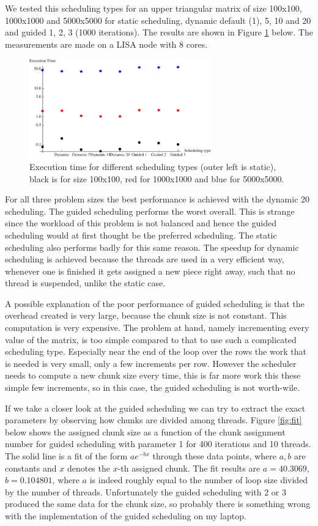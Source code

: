 \documentclass[11pt,a4paper,onecolumn]{article}
\begin{document}
We tested this scheduling types for an upper triangular matrix of size 100x100, 1000x1000 and 5000x5000 for static scheduling, dynamic default (1), 5, 10 and 20 and guided 1, 2, 3 (1000 iterations). The results are shown in Figure \ref{fig:chunks} below. The measurements are made on a LISA node with 8 cores.

\begin{figure}[H]
  \centering
  \includegraphics[width=0.7\textwidth]{chunks.pdf}
  \caption{Execution time for different scheduling types (outer left is static), black is for size 100x100, red for 1000x1000 and blue for 5000x5000.}
  \label{fig:chunks}
\end{figure}

For all three problem sizes the best performance is achieved with the dynamic 20 scheduling. The guided scheduling performs the worst overall. This is strange since the workload of this problem is not balanced and hence the guided scheduling would at first thought be the preferred scheduling. The static scheduling also performs badly for this same reason. The speedup for dynamic scheduling is achieved because the threads are used in a very efficient way, whenever one is finished it gets assigned a new piece right away, such that no thread is suspended, unlike the static case. 

A possible explanation of the poor performance of guided scheduling is that the overhead created is very large, because the chunk size is not constant. This computation is very expensive. The problem at hand, namely incrementing every value of the matrix, is too simple compared to that to use such a complicated scheduling type. Especially near the end of the loop over the rows the work that is needed is very small, only a few increments per row. However the scheduler needs to compute a new chunk size every time, this is far more work this these simple few increments, so in this case, the guided scheduling is not worth-wile.

If we take a closer look at the guided scheduling we can try to extract the exact parameters by observing how chunks are divided among threads. Figure \ref{fig:fit} below shows the assigned chunk size as a function of the chunk assignment number for guided scheduling with parameter 1 for 400 iterations and 10 threads. The solid line is a fit of the form $a e^{-bx}$ through these data points, where $a, b$ are constants and $x$ denotes the $x$-th assigned chunk. The fit results are $a = 40.3069$, $b = 0.104801$, where $a$ is indeed roughly equal to the number of loop size divided by the number of threads. Unfortunately the guided scheduling with 2 or 3 produced the same data for the chunk size, so probably there is something wrong with the implementation of the guided scheduling on my laptop.
\end{document}
